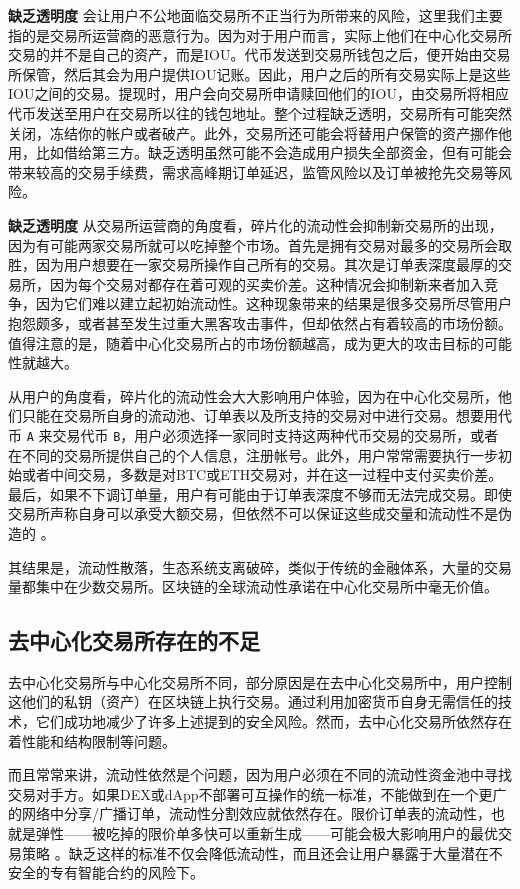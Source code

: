 \documentclass[UTF8]{ctexart}
\begin{document}
\begin{multicols}{2}
\textbf{缺乏透明度} 会让用户不公地面临交易所不正当行为所带来的风险，这里我们主要指的是交易所运营商的恶意行为。因为对于用户而言，实际上他们在中心化交易所交易的并不是自己的资产，而是IOU。代币发送到交易所钱包之后，便开始由交易所保管，然后其会为用户提供IOU记账。因此，用户之后的所有交易实际上是这些IOU之间的交易。提现时，用户会向交易所申请赎回他们的IOU，由交易所将相应代币发送至用户在交易所以往的钱包地址。整个过程缺乏透明，交易所有可能突然关闭，冻结你的帐户或者破产。此外，交易所还可能会将替用户保管的资产挪作他用，比如借给第三方。缺乏透明虽然可能不会造成用户损失全部资金，但有可能会带来较高的交易手续费，需求高峰期订单延迟，监管风险以及订单被抢先交易等风险。

\textbf{缺乏透明度} 从交易所运营商的角度看，碎片化的流动性会抑制新交易所的出现，因为有可能两家交易所就可以吃掉整个市场。首先是拥有交易对最多的交易所会取胜，因为用户想要在一家交易所操作自己所有的交易。其次是订单表深度最厚的交易所，因为每个交易对都存在着可观的买卖价差。这种情况会抑制新来者加入竞争，因为它们难以建立起初始流动性。这种现象带来的结果是很多交易所尽管用户抱怨颇多，或者甚至发生过重大黑客攻击事件，但却依然占有着较高的市场份额。值得注意的是，随着中心化交易所占的市场份额越高，成为更大的攻击目标的可能性就越大。

从用户的角度看，碎片化的流动性会大大影响用户体验，因为在中心化交易所，他们只能在交易所自身的流动池、订单表以及所支持的交易对中进行交易。想要用代币 \verb|A| 来交易代币 \verb|B|，用户必须选择一家同时支持这两种代币交易的交易所，或者在不同的交易所提供自己的个人信息，注册帐号。此外，用户常常需要执行一步初始或者中间交易，多数是对BTC或ETH交易对，并在这一过程中支付买卖价差。最后，如果不下调订单量，用户有可能由于订单表深度不够而无法完成交易。即使交易所声称自身可以承受大额交易，但依然不可以保证这些成交量和流动性不是伪造的 \cite{fakevolume}。

其结果是，流动性散落，生态系统支离破碎，类似于传统的金融体系，大量的交易量都集中在少数交易所。区块链的全球流动性承诺在中心化交易所中毫无价值。

\subsection{去中心化交易所存在的不足}
去中心化交易所与中心化交易所不同，部分原因是在去中心化交易所中，用户控制这他们的私钥（资产）在区块链上执行交易。通过利用加密货币自身无需信任的技术，它们成功地减少了许多上述提到的安全风险。然而，去中心化交易所依然存在着性能和结构限制等问题。

而且常常来讲，流动性依然是个问题，因为用户必须在不同的流动性资金池中寻找交易对手方。如果DEX或dApp不部署可互操作的统一标准，不能做到在一个更广的网络中分享/广播订单，流动性分割效应就依然存在。限价订单表的流动性，也就是弹性——被吃掉的限价单多快可以重新生成——可能会极大影响用户的最优交易策略 \cite{limitorderliquidity}。缺乏这样的标准不仅会降低流动性，而且还会让用户暴露于大量潜在不安全的专有智能合约的风险下。


\end{multicols}
\end{document}
